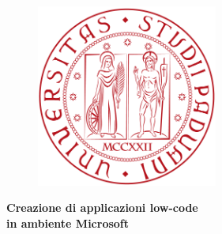 \begin{titlepage}

    \begin{center}
    
    \begin{LARGE}
    \textbf{\myUni}\\
    \end{LARGE}
    
    \vspace{10pt}
    
    \begin{Large}
    \textsc{\myDepartment}\\
    \end{Large}
    
    \vspace{10pt}
    
    \begin{large}
    \textsc{\myFaculty}\\
    \end{large}
    
    \vspace{20pt}
    \begin{figure}[htbp]
    \begin{center}
    \includegraphics[height=6cm]{immagini/logo-unipd.png}
    \end{center}
    \end{figure}
    \vspace{-10pt} 
    
    \begin{LARGE}
    \begin{center}
    \textbf{Creazione di applicazioni low-code \\ in ambiente Microsoft}\\
    \end{center}
    \end{LARGE}
    
    \vspace{10pt} 
    

\end{center}
\end{titlepage}
